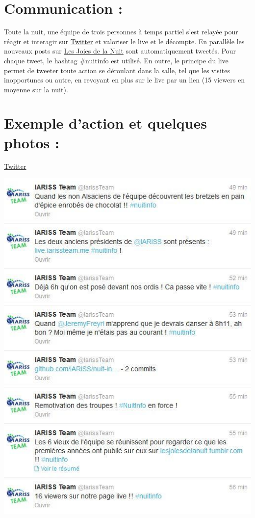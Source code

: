 \documentclass[12pt, a4paper]{article}
\newcommand{\espace}{\vspace{.8cm}}
\begin{document}
\espace{}
\section{Communication : }
Toute la nuit, une équipe de trois personnes à temps partiel s’est relayée pour réagir et interagir sur \href{https://twitter.com/}{Twitter} et valoriser le live et le décompte. En parallèle les nouveaux posts sur \href{http://lesjoiesdelanuit.tumblr.com/}{Les Joies de la Nuit} sont automatiquement tweetés. Pour chaque tweet, le hashtag \#nuitinfo est utilisé.
En outre, le principe du live permet de tweeter toute action se déroulant dans la salle, tel que les visites inopportunes ou autre, en revoyant en plus sur le live par un lien (15 viewers en moyenne sur la nuit).

\espace{}
\section{Exemple d'action et quelques photos : }
\href{https://twitter.com/}{Twitter}
\espace{}
\begin{center}
\includegraphics[width=.9\textwidth, keepaspectratio=true]{img/twitter.png}
\end{center}
\espace{}
\end{document}
